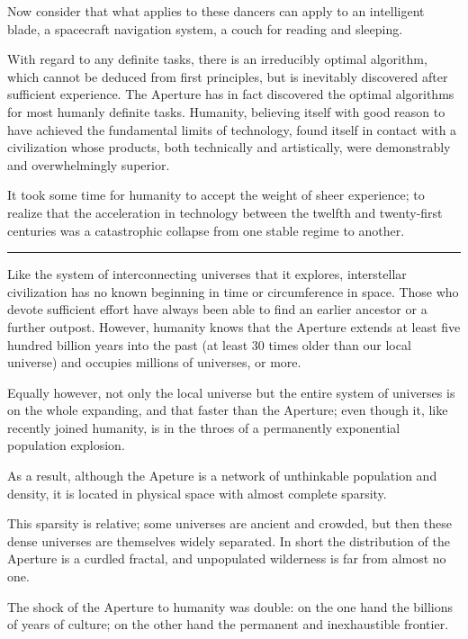 \documentclass[english,11pt,letterpaper,onecolumn]{scrbook}
\begin{document}
	Now consider that what applies to these dancers can apply to an intelligent blade, a spacecraft navigation system, a couch for reading and sleeping.

	With regard to any definite tasks, there is an irreducibly optimal algorithm, which cannot be deduced from first principles, but is inevitably discovered after sufficient experience.  The Aperture has in fact discovered the optimal algorithms for most humanly definite tasks.  Humanity, believing itself with good reason to have achieved the fundamental limits of technology, found itself in contact with a civilization whose products, both technically and artistically, were demonstrably and overwhelmingly superior.

	It took some time for humanity to accept the weight of sheer experience; to realize that the acceleration in technology between the twelfth and twenty-first centuries was a catastrophic collapse from one stable regime to another.

\begin{center}\rule[3pt]{2in}{0.5pt}\end{center}

	Like the system of interconnecting universes that it explores, interstellar civilization has no known beginning in time or circumference in space.  Those who devote sufficient effort have always been able to find an earlier ancestor or a further outpost.  However, humanity knows that the Aperture extends at least five hundred billion years into the past (at least 30 times older than our local universe) and occupies millions of universes, or more.

	Equally however, not only the local universe but the entire system of universes is on the whole expanding, and that faster than the Aperture; even though it, like recently joined humanity, is in the throes of a permanently exponential population explosion.

	As a result, although the Apeture is a network of unthinkable population and density, it is located in physical space with almost complete sparsity.

	This sparsity is relative; some universes are ancient and crowded, but then these dense universes are themselves widely separated.  In short the distribution of the Aperture is a curdled fractal, and unpopulated wilderness is far from almost no one.

	The shock of the Aperture to humanity was double:  on the one hand the billions of years of culture; on the other hand the permanent and inexhaustible frontier.
\end{document}
